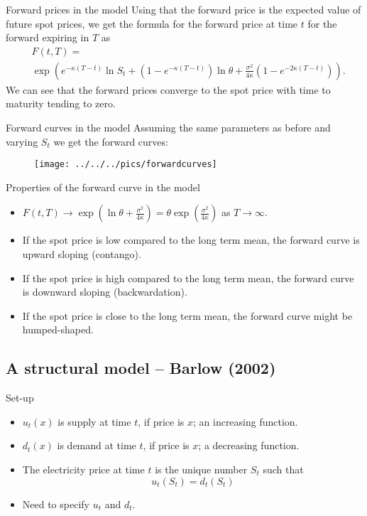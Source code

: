 {%
{Forward prices in the model}
Using that the forward price is the expected value of future spot prices,
we get the formula for the forward price at time $t$ for the forward expiring in $T$ as
\begin{align*}
	&F(t,T) = \\
	&\exp \left( e^{-\kappa(T-t)} \ln S_t + (1-e^{-\kappa(T-t)}) \ln \theta + \frac{\sigma^2}{4\kappa}(1-e^{-2\kappa(T-t)}) \right).
\end{align*}
We can see that the forward prices converge to the spot price with time to maturity tending to zero.



{Forward curves in the model}
Assuming the same parameters as before and varying $S_t$ we get the forward curves:
\begin{figure}
	\centering
		\texttt{[image: ../../../pics/forwardcurves]}
	\label{fig:forwardcurves}
\end{figure}





{Properties of the forward curve in the model}
\begin{itemize}
\item<1-> $F(t,T) \rightarrow \exp(\ln \theta + \frac{\sigma^2}{4 \kappa}) = \theta \exp{(\frac{\sigma^2}{4\kappa})}$ as $T \rightarrow \infty$.
\item<2-> If the spot price is low compared to the long term mean, the forward curve is upward sloping (contango).
\item<3-> If the spot price is high compared to the long term mean, the forward curve is downward sloping (backwardation).
\item<4-> If the spot price is close to the long term mean, the forward curve might be humped-shaped.
\end{itemize}


\subsection{A structural model -- Barlow (2002)}


{Set-up}
\begin{itemize}
\item<1-> $u_t(x)$ is supply at time $t$, if price is $x$; an increasing function.
\item<2-> $d_t(x)$ is demand at time $t$, if price is $x$; a decreasing function.
\item<3-> The electricity price at time $t$ is the unique number $S_t$ such that
$$
u_t(S_t)=d_t(S_t)
$$
\item<4-> Need to specify $u_t$ and $d_t$.
\end{itemize}


}
